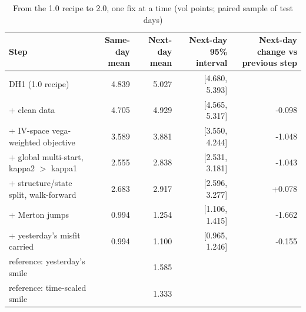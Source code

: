 \begin{table}[ht]
\centering
\small
\caption{From the 1.0 recipe to 2.0, one fix at a time (vol points; paired sample of test days)}
\begin{tabular}{lrrrr}
\toprule
Step & Same-day mean & Next-day mean & Next-day 95\% interval & Next-day change vs previous step \\
\midrule
DH1 (1.0 recipe) & 4.839 & 5.027 & [4.680, 5.393] &  \\
+ clean data & 4.705 & 4.929 & [4.565, 5.317] & -0.098 \\
+ IV-space vega-weighted objective & 3.589 & 3.881 & [3.550, 4.244] & -1.048 \\
+ global multi-start, kappa2 $>$ kappa1 & 2.555 & 2.838 & [2.531, 3.181] & -1.043 \\
+ structure/state split, walk-forward & 2.683 & 2.917 & [2.596, 3.277] & +0.078 \\
+ Merton jumps & 0.994 & 1.254 & [1.106, 1.415] & -1.662 \\
+ yesterday's misfit carried & 0.994 & 1.100 & [0.965, 1.246] & -0.155 \\
reference: yesterday's smile &  & 1.585 &  &  \\
reference: time-scaled smile &  & 1.333 &  &  \\
\bottomrule
\end{tabular}
\par{}
\end{table}
